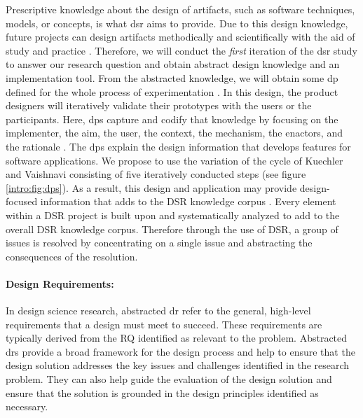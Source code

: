 Prescriptive knowledge about the design of artifacts, such as software techniques, models, or concepts, is what \ac{dsr} aims to provide.
Due to this design knowledge, future projects can design artifacts methodically and scientifically with the aid of study and practice \cite{paper:designprinciple:vk}. 
Therefore, we will conduct the \textit{first} iteration of the \ac{dsr} study to answer our research question and obtain abstract design knowledge and an implementation tool. 
From the abstracted knowledge, we will obtain some \ac{dp} defined for the whole process of experimentation \cite{paper:designprinciple:vk}.
In this design, the product designers will iteratively validate their prototypes with the users or the participants. 
Here, \ac{dp}s capture and codify that knowledge by focusing on the implementer, the aim, the user, the context, the mechanism, the enactors, and the rationale \cite{paper:designprinciple:gregor}. 
The \ac{dp}s explain the design information that develops features for software applications.
We propose to use the variation of the cycle of Kuechler and Vaishnavi \cite{paper:designprinciple:vk} consisting of five iteratively conducted steps (see figure \ref{intro:fig:dps}). 
As a result, this design and application may provide design-focused information that adds to the DSR knowledge corpus \cite{misc:dsr:henver}.
Every element within a DSR project is built upon and systematically analyzed to add to the overall DSR knowledge corpus.
Therefore through the use of DSR, a group of issues is resolved by concentrating on a single issue and abstracting the consequences of the resolution.

\paragraph*{Design Requirements:}
In design science research, abstracted \ac{dr} refer to the general, high-level requirements that a design must meet to succeed. 
These requirements are typically derived from the RQ identified as relevant to the problem.
Abstracted \ac{dr}s provide a broad framework for the design process and help to ensure that the design solution addresses the key issues and challenges identified in the research problem. 
They can also help guide the evaluation of the design solution and ensure that the solution is grounded in the design principles identified as necessary.

